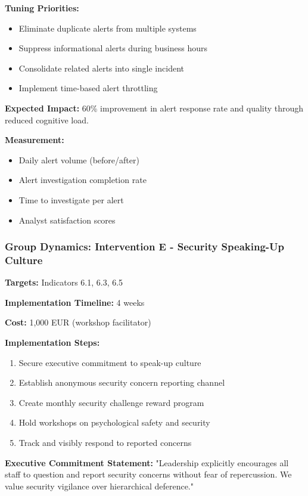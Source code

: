 \documentclass[11pt,a4paper]{article}
\begin{document}
\textbf{Tuning Priorities:}
\begin{itemize}
\item Eliminate duplicate alerts from multiple systems
\item Suppress informational alerts during business hours
\item Consolidate related alerts into single incident
\item Implement time-based alert throttling
\end{itemize}

\textbf{Expected Impact:} 60\% improvement in alert response rate and quality through reduced cognitive load.

\textbf{Measurement:}
\begin{itemize}
\item Daily alert volume (before/after)
\item Alert investigation completion rate
\item Time to investigate per alert
\item Analyst satisfaction scores
\end{itemize}

\subsubsection{Group Dynamics: Intervention E - Security Speaking-Up Culture}

\textbf{Targets:} Indicators 6.1, 6.3, 6.5

\textbf{Implementation Timeline:} 4 weeks

\textbf{Cost:} 1,000 EUR (workshop facilitator)

\textbf{Implementation Steps:}
\begin{enumerate}
\item Secure executive commitment to speak-up culture
\item Establish anonymous security concern reporting channel
\item Create monthly security challenge reward program
\item Hold workshops on psychological safety and security
\item Track and visibly respond to reported concerns
\end{enumerate}

\textbf{Executive Commitment Statement:}
"Leadership explicitly encourages all staff to question and report security concerns without fear of repercussion. We value security vigilance over hierarchical deference."
\end{document}
